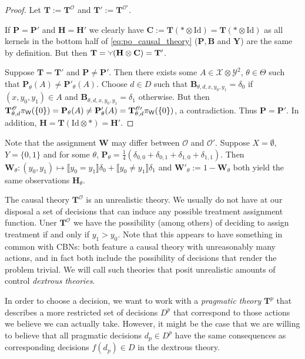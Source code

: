 \begin{proof}

Let $\mathbf{T}:=\mathbf{T}^{\mathscr{O}}$ and $\mathbf{T}':=\mathbf{T}^{\mathscr{O}'}$.

If $\mathbf{P}=\mathbf{P}'$ and $\mathbf{H}=\mathbf{H}'$ we clearly have $\mathbf{C}:=\mathbf{T}(*\otimes \mathrm{Id}) = \mathbf{T}(*\otimes \mathrm{Id})$ as all kernels in the bottom half of \ref{eq:po_causal_theory} ($\mathbf{P},\mathbf{B}$ and $\mathbf{Y}$) are the same by definition. But then $\mathbf{T} = \splitter{0.1}(\mathbf{H}\otimes\mathbf{C}) = \mathbf{T}'$.

Suppose $\mathbf{T}=\mathbf{T}'$ and $\mathbf{P}\neq \mathbf{P}'$. Then there exists some $A\in \mathcal{X}\otimes\mathcal{Y}^2$, $\theta\in \Theta$ such that $\mathbf{P}_\theta (A) \neq \mathbf{P}'_\theta(A)$. Choose $d\in D$ such that $\mathbf{B}_{\theta,d,x,y_0,y_1} = \delta_0$ if $(x,y_0,y_1)\in A$ and $\mathbf{B}_{\theta,d,x,y_0,y_1} = \delta_1$ otherwise. But then $\mathbf{T}^\mathscr{O}_{\theta,d} \pi_{\mathsf{W}} (\{0\})  =\mathbf{P}_\theta (A) \neq \mathbf{P}'_\theta(A) = \mathbf{T}^{\mathscr{O}\prime}_{\theta,d} \pi_{\mathsf{W}} (\{0\})$, a contradiction. Thus $\mathbf{P}=\mathbf{P}'$. In addition, $\mathbf{H} = \mathbf{T}(\mathrm{Id}\otimes *) = \mathbf{H}'$.
\end{proof}

Note that the assignment $\mathbf{W}$ may differ between $\mathscr{O}$ and $\mathscr{O}'$. Suppose $X=\emptyset$, $Y=\{0,1\}$ and for some $\theta$, $\mathbf{P}_\theta = \frac{1}{4}(\delta_{0,0}+\delta_{0,1}+\delta_{1,0}+\delta_{1,1})$. Then $\mathbf{W}_\theta:(y_0,y_1)\mapsto \llbracket y_0=y_1\rrbracket\delta_0 + \llbracket y_0\neq y_1\rrbracket \delta_1$ and $\mathbf{W}'_\theta := 1-\mathbf{W}_\theta$ both yield the same observations $\mathbf{H}_\theta$.

The causal theory $\mathbf{T}^{\mathscr{O}}$ is an unrealistic theory. We usually do not have at our disposal a set of decisions that can induce any possible treatment assignment function. Uner $\mathbf{T}^{\mathscr{O}}$ we have the possibility (among others) of deciding to assign treatment if and only if $y_1 > y_0$. Note that this appears to have something in common with CBNs: both feature a causal theory with unreasonably many actions, and in fact both include the possibility of decisions that render the problem trivial. We will call such theories that posit unrealistic amounts of control \emph{dextrous theories}.

In order to choose a decision, we want to work with a \emph{pragmatic theory} $\mathbf{T}^p$ that describes a more restricted set of decisions $D^p$ that correspond to those actions we believe we can actually take. However, it might be the case that we are willing to believe that all pragmatic decisions $d_p\in D^p$ have the same consequences as corresponding decisions $f(d_p)\in D$ in the dextrous theory.

